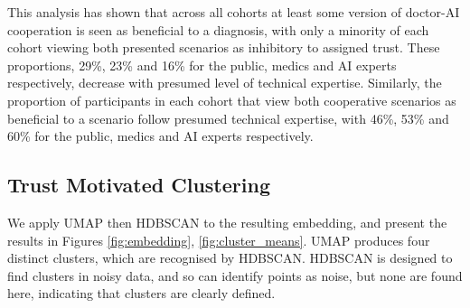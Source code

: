 \documentclass[manuscript,screen,review]{acmart}
\begin{document}
This analysis has shown that across all cohorts at least some version of doctor-AI cooperation is seen as beneficial to a diagnosis, with only a minority of each cohort viewing both presented scenarios as inhibitory to assigned trust. These proportions, 29\%, 23\% and 16\% for the public, medics and AI experts respectively, decrease with presumed level of technical expertise. Similarly, the proportion of participants in each cohort that view both cooperative scenarios as beneficial to a scenario follow presumed technical expertise, with 46\%, 53\% and 60\% for the public, medics and AI experts respectively.

\subsection{Trust Motivated Clustering}



We apply UMAP then HDBSCAN to the resulting embedding, and present the results in Figures \ref{fig:embedding}, \ref{fig:cluster_means}. UMAP produces four distinct clusters, which are recognised by HDBSCAN. HDBSCAN is designed to find clusters in noisy data, and so can identify points as noise, but none are found here, indicating that clusters are clearly defined.
\end{document}
